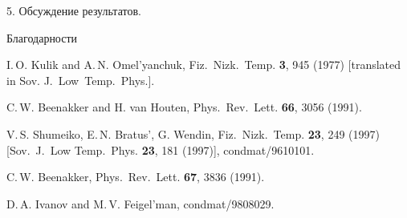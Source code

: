\documentclass{jetpl}
\begin{document}
5. Обсуждение результатов.

Благодарности


\begin{thebibliography}{99}
I.\,O. Kulik and A.\,N. Omel'yanchuk, Fiz.~Nizk.~Temp. {\bf 3}, 945
(1977) [translated in Sov. J.~Low~Temp.~Phys.].

C.\,W. Beenakker and H. van Houten, Phys.~Rev.~Lett. {\bf 66}, 3056
(1991).

V.\,S. Shumeiko, E.\,N. Bratus', G. Wendin, Fiz.~Nizk.~Temp. {\bf 23},
249 (1997) [Sov.~J.~Low Temp.~Phys. {\bf 23}, 181 (1997)],
cond\D mat/9610101.

C.\,W. Beenakker, Phys.~Rev.~Lett. {\bf 67}, 3836 (1991).

D.\,A. Ivanov and M.\,V. Feigel'man, cond\D mat/9808029.

\end{thebibliography}
\end{document}
